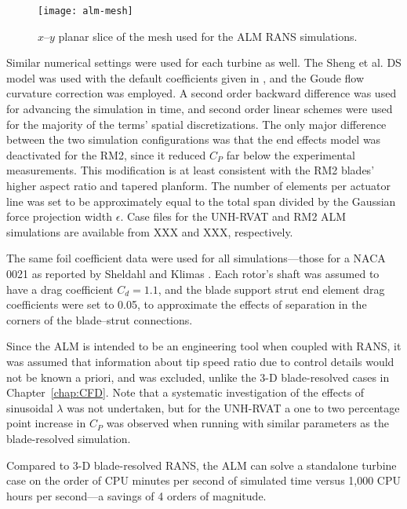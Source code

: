 \begin{figure}
    \centering

    \texttt{[image: alm-mesh]}

    \caption{$x$--$y$ planar slice of the mesh used for the ALM RANS
        simulations.}

    \label{fig:ALM-mesh}
\end{figure}

Similar numerical settings were used for each turbine as well. The Sheng et al.
DS model was used with the default coefficients given in \cite{Sheng2008}, and
the Goude flow curvature correction was employed. A second order backward
difference was used for advancing the simulation in time, and second order
linear schemes were used for the majority of the terms' spatial discretizations.
The only major difference between the two simulation configurations was that the
end effects model was deactivated for the RM2, since it reduced $C_P$ far below
the experimental measurements. This modification is at least consistent with the
RM2 blades' higher aspect ratio and tapered planform. The number of elements per
actuator line was set to be approximately equal to the total span divided by the
Gaussian force projection width $\epsilon$. Case files for the UNH-RVAT and RM2
ALM simulations are available from XXX and XXX, respectively. 

The same foil coefficient data were used for all simulations---those for a NACA
0021 as reported by Sheldahl and Klimas \cite{Sheldahl1981}. Each rotor's shaft
was assumed to have a drag coefficient $C_d = 1.1$, and the blade support strut
end element drag coefficients were set to 0.05, to approximate the effects of
separation in the corners of the blade--strut connections.

Since the ALM is intended to be an engineering tool when coupled with RANS, it
was assumed that information about tip speed ratio due to control details would
not be known a priori, and was excluded, unlike the 3-D blade-resolved cases in
Chapter~\ref{chap:CFD}. Note that a systematic investigation of the effects of
sinusoidal $\lambda$ was not undertaken, but for the UNH-RVAT a one to two
percentage point increase in $C_P$ was observed when running with similar
parameters as the blade-resolved simulation.

Compared to 3-D blade-resolved RANS, the ALM can solve a standalone turbine case
on the order of CPU minutes per second of simulated time versus 1,000 CPU hours
per second---a savings of 4 orders of magnitude.


